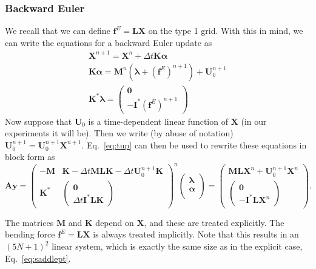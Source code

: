 \subsubsection{Backward Euler}
We recall that we can define $\bm{f}^E = \bm{L}\bm{X}$ on the type 1 grid. With this in mind, we can write the equations for a backward Euler update as
\begin{gather}
\label{eq:tup}
\bm{X}^{n+1} = \bm{X}^{n} + \Delta t  \bm{K} \bm{\alpha} \\[2 pt]
\label{eq:BEeqn}
\bm{K}\bm{\alpha}= \bm{M}^n\left(\bm{\lambda}+\left(\bm{f}^E\right)^{n+1}\right)+\bm{U}_0^{n+1}\\[2 pt]
\bm{K}^* \bm{\lambda}=\begin{pmatrix} \bm{0}\\[2 pt] -\bm{I}^*\left(\bm{f}^E\right)^{n+1}\end{pmatrix}
\end{gather}
Now suppose that $\bm{U}_0$ is a time-dependent linear function of $\bm{X}$ (in our experiments it will be). Then we write (by abuse of notation) $\bm{U}_0^{n+1} = \bm{U}_0^{n+1}\bm{X}^{n+1}$. 
Eq.\ \eqref{eq:tup} can then be used to rewrite these equations in block form as
\begin{equation}
\label{eq:impsolve}
\bm{A}\bm{y}=
    \begin{pmatrix}
    -\bm{M} &\bm{K}-\Delta t \bm{MLK}-\Delta t \bm{U}_0^{n+1}\bm{K} \\[4 pt]
   \bm{K}^* &\begin{pmatrix} \bm{0}\\[2 pt]\Delta t \bm{I}^*\bm{LK}\end{pmatrix} 
    \end{pmatrix}^n
    \begin{pmatrix} 
    \bm{\lambda}\\[4 pt]
    \bm{\alpha}\\[4 pt]
    \end{pmatrix} =  \begin{pmatrix} 
   \bm{ML}\bm{X}^n+\bm{U}_0^{n+1}\bm{X}^n\\[4 pt]
    \begin{pmatrix} \bm{0}\\[4 pt]
    -\bm{I}^*\bm{L}\bm{X}^n \end{pmatrix}
    \end{pmatrix}. 
\end{equation}

The matrices $\bm{M}$ and $\bm{K}$ depend on $\bm{X}$, and these are treated explicitly. The bending force $\bm{f}^E = \bm{L}\bm{X}$ is always treated implicitly. Note that this results in an $(5N+1)^2$ linear system, which is exactly the same size as in the explicit case, Eq.\ \eqref{eq:saddlept}. 


